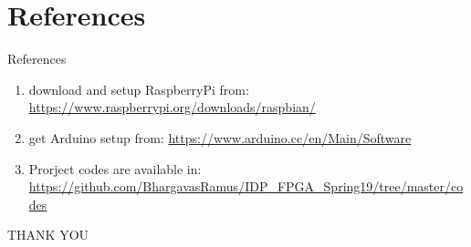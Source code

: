 \documentclass[10pt]{beamer}
\begin{document}
\section{References}
\begin{frame}{References}
    \begin{enumerate}
        \item download and setup RaspberryPi from: \url{https://www.raspberrypi.org/downloads/raspbian/}
        \item get Arduino setup from:  \url{https://www.arduino.cc/en/Main/Software}
        \item Prorject codes are available in: \url{https://github.com/BhargavasRamus/IDP_FPGA_Spring19/tree/master/codes}
    \end{enumerate}
    
\end{frame}

{
\begin{frame}[standout]
  \Huge{THANK YOU}
\end{frame}
}
\end{document}
